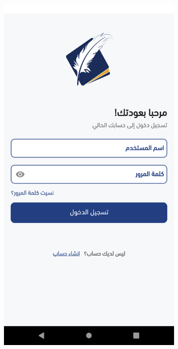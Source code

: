\begin{figure}[H]
     \centering%
     \begin{subfigure}[b]{0.3\textwidth}
         \centering
         \includegraphics[width=\textwidth]{images/app/mobile/mobile-1.png}

\end{subfigure}
\end{figure}
